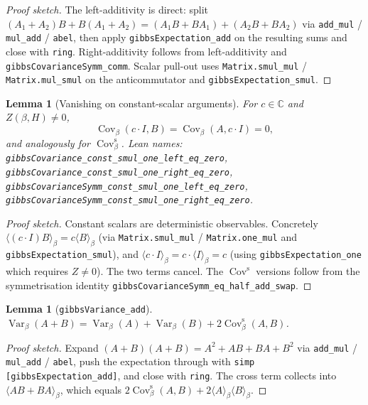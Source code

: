 \documentclass[a4paper,11pt]{article}
\newtheorem{lemma}[theorem]{Lemma}
\begin{document}
\begin{proof}[Proof sketch]
The left-additivity is direct: split
$(A_1 + A_2) B + B (A_1 + A_2) = (A_1 B + B A_1) + (A_2 B + B A_2)$
via \texttt{add\_mul} / \texttt{mul\_add} / \texttt{abel}, then apply
\texttt{gibbsExpectation\_add} on the resulting sums and close with
\texttt{ring}.  Right-additivity follows from left-additivity and
\texttt{gibbsCovarianceSymm\_comm}.  Scalar pull-out uses
\texttt{Matrix.smul\_mul} / \texttt{Matrix.mul\_smul} on the
anticommutator and \texttt{gibbsExpectation\_smul}.
\end{proof}

\begin{lemma}[Vanishing on constant-scalar arguments]
For $c \in \mathbb{C}$ and $Z(\beta, H) \neq 0$,
\[
  \operatorname{Cov}_\beta(c \cdot I, B)
  = \operatorname{Cov}_\beta(A, c \cdot I)
  = 0,
\]
and analogously for $\operatorname{Cov}^{\mathrm{s}}_\beta$.
Lean names: \texttt{gibbsCovariance\_const\_smul\_one\_left\_eq\_zero},
\texttt{gibbsCovariance\_const\_smul\_one\_right\_eq\_zero},
\texttt{gibbsCovarianceSymm\_const\_smul\_one\_left\_eq\_zero},
\texttt{gibbsCovarianceSymm\_const\_smul\_one\_right\_eq\_zero}.
\end{lemma}

\begin{proof}[Proof sketch]
Constant scalars are deterministic observables.  Concretely
$\langle (c \cdot I) B \rangle_\beta = c \langle B \rangle_\beta$
(via \texttt{Matrix.smul\_mul} / \texttt{Matrix.one\_mul} and
\texttt{gibbsExpectation\_smul}), and
$\langle c \cdot I \rangle_\beta = c \cdot \langle I \rangle_\beta = c$
(using \texttt{gibbsExpectation\_one} which requires $Z \neq 0$).
The two terms cancel.  The $\operatorname{Cov}^{\mathrm{s}}$ versions
follow from the symmetrisation identity
\texttt{gibbsCovarianceSymm\_eq\_half\_add\_swap}.
\end{proof}

\begin{lemma}[\texttt{gibbsVariance\_add}]
$\operatorname{Var}_\beta(A + B)
 = \operatorname{Var}_\beta(A) + \operatorname{Var}_\beta(B)
   + 2 \operatorname{Cov}^{\mathrm{s}}_\beta(A, B)$.
\end{lemma}

\begin{proof}[Proof sketch]
Expand
$(A + B)(A + B) = A^2 + A B + B A + B^2$
via \texttt{add\_mul} / \texttt{mul\_add} / \texttt{abel}, push the
expectation through with \texttt{simp [gibbsExpectation\_add]}, and
close with \texttt{ring}.  The cross term collects into
$\langle A B + B A \rangle_\beta$, which equals
$2 \operatorname{Cov}^{\mathrm{s}}_\beta(A, B) + 2 \langle A \rangle_\beta \langle B \rangle_\beta$.
\end{proof}
\end{document}
